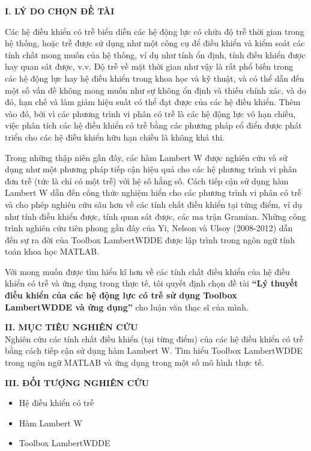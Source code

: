 \documentclass[12pt,oneside,portrait,a4paper]{book}
\theoremstyle{definition}
\theoremstyle{plain}
\begin{document}
\noindent 
\textbf{ I. LÝ DO CHỌN ĐỀ TÀI}\\
\hspace*{0,5cm}

Các hệ điều khiển có trễ biểu diễn các hệ động lực có chứa độ trễ thời gian trong hệ thống, hoặc trễ được sử dụng như một công cụ để điều khiển và kiểm soát các tính chất mong muốn của hệ thống, ví dụ như tính ổn định, tính điều khiển được hay quan sát được, v.v. Độ trễ về mặt thời gian như vậy là rất phổ biến trong các hệ động lực hay hệ điều khiển trong khoa học và kỹ thuật, và có thể dẫn đến một số vấn đề không mong muốn như sự không ổn định và thiếu chính xác, và do đó, hạn chế và làm giảm hiệu suất có thể đạt được của các hệ điều khiển. Thêm vào đó, bởi vì các phương trình vi phân có trễ là các hệ động lực vô hạn chiều, việc phân tích các hệ điều khiển có trễ bằng các phương pháp cổ điển được phát triển cho các hệ điều khiển hữu hạn chiều là không khả thi.

Trong những thập niên gần đây, các hàm Lambert W được nghiên cứu và sử dụng như một phương pháp tiếp cận hiệu quả cho các hệ phương trình vi phân đơn trễ (tức là chỉ có một trễ) với hệ số hằng số. 
Cách tiếp cận sử dụng hàm Lambert W dẫn đến công thức nghiệm hiển cho các phương trình vi phân có trễ và cho phép nghiên cứu sâu hơn về các tính chất điều khiển tại từng điểm, ví dụ như tính điều khiển được, tính quan sát được, 
các ma trận Gramian. Những công trình nghiên cứu tiên phong gần đây của Yi, Nelson và Ulsoy (2008-2012) dẫn đến sự ra đời của Toolbox LambertWDDE được lập trình trong ngôn ngữ tính toán khoa học MATLAB. 

Với mong muốn được tìm hiểu kĩ hơn về các tính chất điều khiển của hệ điều khiển có trễ và ứng dụng trong thực tế, tôi quyết định chọn đề tài \textbf{``Lý thuyết điều khiển của các hệ động lực có trễ sử dụng Toolbox LambertWDDE và ứng dụng''} cho luận văn thạc sĩ của mình. 

\vspace{6pt}
\noindent 
\textbf{ II. MỤC TIÊU NGHIÊN CỨU}\\
\hspace*{0,5cm} Nghiên cứu các tính chất điều khiển (tại từng điểm) của các hệ điều khiển có trễ bằng cách tiếp cận sử dụng hàm Lambert W. Tìm hiểu Toolbox LambertWDDE trong ngôn ngữ MATLAB và ứng dụng trong một số mô hình thực tế.   

\vspace{6pt}
\noindent 
\textbf{ III. ĐỐI TƯỢNG NGHIÊN CỨU}
\begin{itemize}
\item Hệ điều khiển có trễ
\item Hàm Lambert W
\item Toolbox LambertWDDE
\end{itemize}
\end{document}
